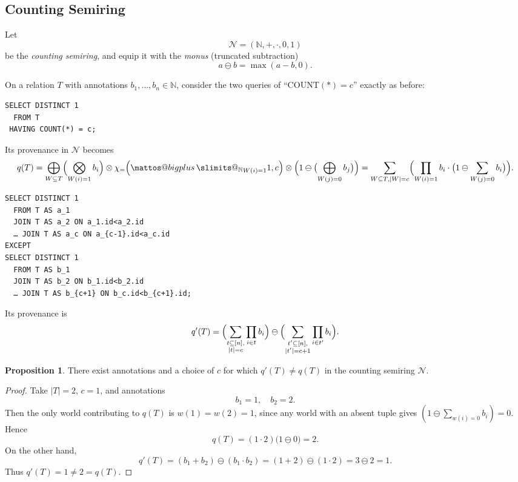 \documentclass[10pt,a4paper]{scrartcl}
\makeatletter
\theoremstyle{definition}
\newtheorem{proposition}[theorem]{Proposition}
\theoremstyle{remark}
\newcommand{\bigplus}{%
  \DOTSB\mathop{\mathpalette\mattos@bigplus\relax}\slimits@
}
\newcommand\mattos@bigplus[2]{%
  \vcenter{\hbox{%
    \sbox\z@{$#1\sum$}%
    \resizebox{!}{0.9\dimexpr\ht\z@+\dp\z@}{\raisebox{\depth}{$\m@th#1+$}}%
  }}%
  \vphantom{\sum}%
}
\makeatother
\begin{document}
\subsection*{Counting Semiring}

Let
\[
  \mathcal{N} = (\mathbb{N},+,\cdot,0,1)
\]
be the \emph{counting semiring}, and equip it with the \emph{monus} (truncated subtraction)
\[
  a \ominus b =\max(a - b,0).
\]

On a relation \(T\) with annotations \(b_1,\dots,b_n\in\mathbb{N}\), consider the two queries of 
“\(\mathrm{COUNT}(*) = c\)” exactly as before:

\begin{verbatim}
SELECT DISTINCT 1
  FROM T
 HAVING COUNT(*) = c;
\end{verbatim}

Its provenance in \(\mathcal{N}\) becomes
\[
  q(T)
  =
  \bigoplus_{W\subseteq T}
    \Bigl(\bigotimes_{W(i)=1}b_i\Bigr)\otimes\chi_{=}\Bigl({\bigplus_{\mathbb{N}}}_{W(i)=1} 1, c\Bigr)\otimes\Bigl(1 \ominus \bigl(\bigoplus_{W(j) = 0}b_j\bigr)\Bigr)
  =
  \sum_{W\subseteq T, |W|=c}
    \Bigl(\prod_{W(i)=1}b_i\cdot\bigl(1\ominus\sum_{W(j)=0}b_i\bigr)\Bigr).
\]

\begin{verbatim}
SELECT DISTINCT 1
  FROM T AS a_1
  JOIN T AS a_2 ON a_1.id<a_2.id
  … JOIN T AS a_c ON a_{c-1}.id<a_c.id
EXCEPT
SELECT DISTINCT 1
  FROM T AS b_1
  JOIN T AS b_2 ON b_1.id<b_2.id
  … JOIN T AS b_{c+1} ON b_c.id<b_{c+1}.id;
\end{verbatim}

Its provenance is
\[
  q'(T)
  =
  \Bigl(\sum_{\substack{t\subseteq[n],\\|t|=c}}\prod_{i\in t}b_i\Bigr)
  \ominus
  \Bigl(\sum_{\substack{t'\subseteq[n],\\|t'|=c+1}}\prod_{i\in t'}b_i\Bigr).
\]

\begin{proposition}
There exist annotations and a choice of \(c\) for which
\(q'(T)\neq q(T)\)
in the counting semiring \(\mathcal{N}\).
\end{proposition}

\begin{proof}
Take \(\lvert T\rvert=2\), \(c=1\), and annotations
\[
  b_1 = 1,\quad b_2 = 2.
\]
Then the only world contributing to \(q(T)\) is \(w(1)=w(2)=1\), since any world with an absent tuple gives
\((1\ominus\sum_{w(i)=0}b_i)=0\).  Hence
\[
  q(T)
  = (1\cdot2)\bigl(1\ominus0\bigr)
  = 2.
\]
On the other hand,
\[
  q'(T)
  = (b_1+b_2)\ominus(b_1\cdot b_2)
  = (1+2)\ominus(1\cdot2)
  = 3\ominus2
  = 1.
\]
Thus \(q'(T)=1\neq2=q(T)\).
\end{proof}
\end{document}
